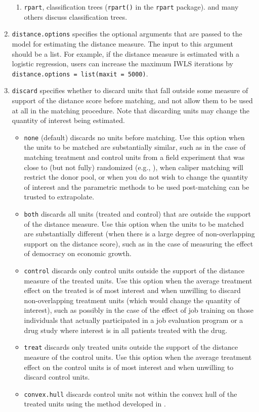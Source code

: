 \documentclass[oneside,letterpaper,titlepage]{article}
\begin{document}
\begin{enumerate}
\begin{enumerate}
  \item \texttt{rpart}, classification trees ({\tt rpart()} in the
    \texttt{rpart} package). \citet{BreFriOls84,RugKimMar03} and many
    others discuss classification trees.
  \end{enumerate}
  
\item \texttt{distance.options} specifies the optional arguments that
  are passed to the model for estimating the distance measure. The
  input to this argument should be a list.  For example, if the
  distance measure is estimated with a logistic regression, users can
  increase the maximum IWLS iterations by \texttt{distance.options =
    list(maxit = 5000)}.

\item \texttt{discard} specifies whether to discard units that fall
  outside some measure of support of the distance score before
  matching, and not allow them to be used at all in the matching
  procedure.  Note that discarding units may change the quantity of
  interest being estimated.
  \begin{itemize}
  \item \texttt{none} (default) discards no units before matching.
    Use this option when the units to be matched are substantially
    similar, such as in the case of matching treatment and control
    units from a field experiment that was close to (but not fully)
    randomized (e.g., \citealt{Imai05}), when caliper matching will
    restrict the donor pool, or when you do not wish to change the
    quantity of interest and the parametric methods to be used
    post-matching can be trusted to extrapolate.
  \item \texttt{both} discards all units (treated and control) that
    are outside the support of the distance measure. Use this option
    when the units to be matched are substantially different (when
    there is a large degree of non-overlapping support on the distance
    score), such as in the case of measuring the effect of democracy
    on economic growth.
  \item \texttt{control} discards only control units outside the
    support of the distance measure of the treated units.  Use this
    option when the average treatment effect on the treated is of most
    interest and when unwilling to discard non-overlapping treatment
    units (which would change the quantity of interest), such as
    possibly in the case of the effect of job training on those
    individuals that actually participated in a job evaluation program
    or a drug study where interest is in all patients treated with the
    drug.
  \item \texttt{treat} discards only treated units outside the support
    of the distance measure of the control units.  Use this option
    when the average treatment effect on the control units is of most
    interest and when unwilling to discard control units.
  \item \texttt{convex.hull} discards control units not within the
    convex hull of the treated units using the method developed in
    \citep{KinZen05b}.
  \end{itemize}
  

\end{enumerate}
\end{document}
